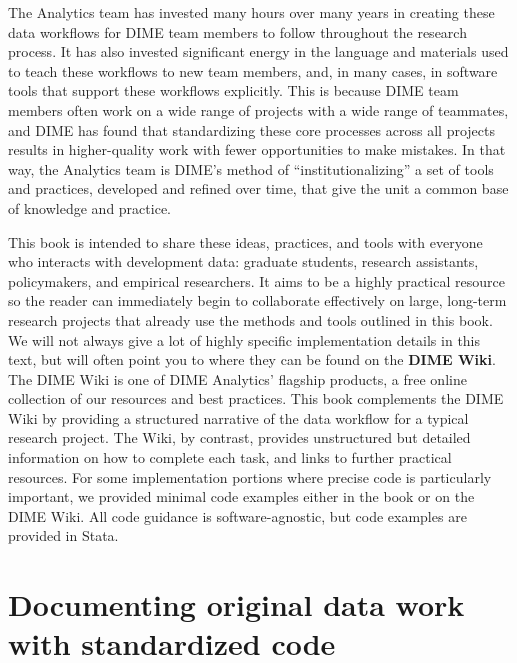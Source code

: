 The Analytics team has invested many hours over many years
in creating these data workflows for DIME team members to follow
throughout the research process.
It has also invested significant energy in the language and materials
used to teach these workflows to new team members,
and, in many cases, in software tools that support these workflows explicitly.
This is because DIME team members often work on a wide range of projects
with a wide range of teammates, and DIME has found
that standardizing these core processes across all projects
results in higher-quality work with fewer opportunities to make mistakes.
In that way, the Analytics team is DIME's method of ``institutionalizing''
a set of tools and practices, developed and refined over time,
that give the unit a common base of knowledge and practice.

This book is intended to share these ideas, practices, and tools
with everyone who interacts with development data:
graduate students, research assistants, policymakers, and empirical researchers.
It aims to be a highly practical resource so the reader can
immediately begin to collaborate effectively on large, long-term research projects
that already use the methods and tools outlined in this book.
We will not always give a lot of highly specific implementation details in this text,
but will often point you to where they can be found on the \textbf{DIME Wiki}.
The DIME Wiki is one of DIME Analytics' flagship products,
a free online collection of our resources and best practices.
This book complements the DIME Wiki by providing a structured narrative
of the data workflow for a typical research project.
The Wiki, by contrast, provides unstructured but detailed information
on how to complete each task, and links to further practical resources.
For some implementation portions where precise code is particularly important,
we provided minimal code examples either in the book or on the DIME Wiki.
All code guidance is software-agnostic, but code examples are provided in Stata.

\section{Documenting original data work with standardized code}

